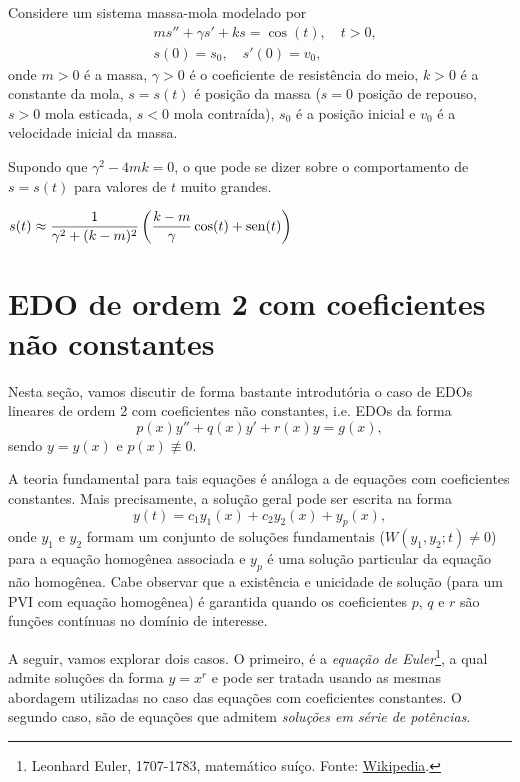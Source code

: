 \begin{exer}
  Considere um sistema massa-mola modelado por
  \begin{align}
    & ms'' + \gamma s' + ks = \cos(t),\quad t>0,\\
    & s(0) = s_0,\quad s'(0) = v_0,
  \end{align}
  onde $m>0$ é a massa, $\gamma>0$ é o coeficiente de resistência do meio, $k>0$ é a constante da mola, $s=s(t)$ é posição da massa ($s=0$ posição de repouso, $s>0$ mola esticada, $s<0$ mola contraída), $s_0$ é a posição inicial e $v_0$ é a velocidade inicial da massa.

  Supondo que $\gamma^2-4mk = 0$, o que pode se dizer sobre o comportamento de $s=s(t)$ para valores de $t$ muito grandes. 
\end{exer}
\begin{resp}
  $s(t) \approx \displaystyle \frac{1}{\gamma^2 + (k-m)^2}\left(\frac{k-m}{\gamma}\cos(t) + \operatorname{sen}(t)\right)$
\end{resp}

\section{EDO de ordem 2 com coeficientes não constantes}\label{cap_edolin_sec_edo2IV}

Nesta seção, vamos discutir de forma bastante introdutória o caso de EDOs lineares de ordem 2 com coeficientes não constantes, i.e. EDOs da forma
\begin{equation}
  p(x)y'' + q(x)y' + r(x)y = g(x),
\end{equation}
sendo $y = y(x)$ e $p(x)\not\equiv 0$.

A teoria fundamental para tais equações é análoga a de equações com coeficientes constantes. Mais precisamente, a solução geral pode ser escrita na forma
\begin{equation}
  y(t) = c_1y_1(x) + c_2y_2(x) + y_p(x),
\end{equation}
onde $y_1$ e $y_2$ formam um conjunto de soluções fundamentais ($W(y_1,y_2;t)\neq 0$) para a equação homogênea associada e $y_p$ é uma solução particular da equação não homogênea. Cabe observar que a existência e unicidade de solução (para um PVI com equação homogênea) é garantida quando os coeficientes $p$, $q$ e $r$ são funções contínuas no domínio de interesse.

A seguir, vamos explorar dois casos. O primeiro, é a \emph{equação de Euler}\footnote{Leonhard Euler, 1707-1783, matemático suíço. Fonte: \href{https://en.wikipedia.org/wiki/Leonhard_Euler}{Wikipedia}.}, a qual admite soluções da forma $y = x^r$ e pode ser tratada usando as mesmas abordagem utilizadas no caso das equações com coeficientes constantes. O segundo caso, são de equações que admitem \emph{soluções em série de potências}.

